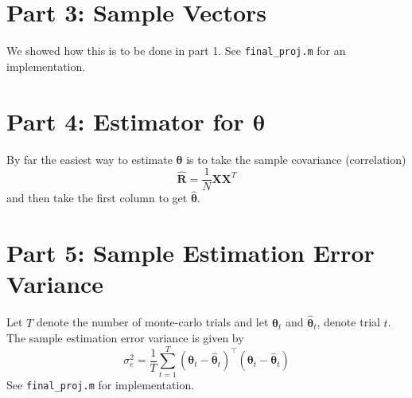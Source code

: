 \documentclass[a4paper]{article}
\begin{document}
  \section*{Part 3: Sample Vectors}%
  We showed how this is to be done in part 1. See \texttt{final\_proj.m} for an implementation.

  \section*{Part 4: Estimator for $\bm{\theta}$}%
  By far the easiest way to estimate $\bm{\theta}$ is to take the sample covariance (correlation)
  \[
    \hat{\mathbf{R}} = \frac{1}{N} \bm{X}\bm{X}^T
  \]
  and then take the first column to get $\hat{\bm{\theta}}$.

  \section*{Part 5: Sample Estimation Error Variance} 
  Let $T$ denote the number of monte-carlo trials and let $\bm{\theta}_t$ and $\hat{\bm{\theta}}_t$, denote trial $t$. The sample estimation error variance is given by
  \[
    \sigma^2_e = \frac{1}{T} \sum_{t=1}^T (\bm{\theta}_t - \hat{\bm{\theta}}_t)^\top (\bm{\theta}_t - \hat{\bm{\theta}}_t)
  \]
  See \texttt{final\_proj.m} for implementation.
\end{document}
